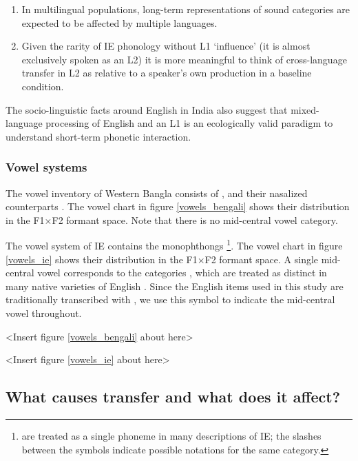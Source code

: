 \documentclass[12 pt]{article}
\newcommand{\nt}[1]{\textipa{[#1]}} %
\begin{document}
\begin{enumerate}[label=(\roman*)]
	\item In multilingual populations, long-term representations of sound categories are expected to be affected by multiple languages. 
	\item Given the rarity of IE phonology without L1 `influence' (it is almost exclusively spoken as an L2) it is more meaningful to think of cross-language transfer in L2 as relative to a speaker's own production in a baseline condition.
\end{enumerate}

The socio-linguistic facts around English in India also suggest that mixed-language processing of English and an L1 is an ecologically valid paradigm to understand short-term phonetic interaction.

\subsubsection*{Vowel systems} \label{vowel systems}
The vowel inventory of Western Bangla consists of \nt{i, e, \ae, a:, O, o, u}, and their nasalized counterparts \citep{garry2001facts}. The vowel chart in figure \ref{vowels_bengali} shows their distribution in the F1$\times$F2 formant space. Note that there is no mid-central vowel category. 


The vowel system of IE contains the monophthongs \nt{I, i, E, e, \ae, @/2/3, a, O, o, U, u} \citep{wells1982accents, masica1972sound}\footnote{\nt{@, 2, and 3} are treated as a single phoneme in many descriptions of IE; the slashes between the symbols indicate possible notations for the same category.}. The vowel chart in figure \ref{vowels_ie} shows their distribution in the F1$\times$F2 formant space. 
A single mid-central vowel corresponds to the categories \nt{2,@,3:}, which are treated as distinct in many native varieties of English \citep{nihalani1979indian,wells1982accents,hickey2005legacies,bansal1969intelligibility}. Since the English items used in this study are traditionally transcribed with \nt{2}, we use this symbol to indicate the mid-central vowel throughout. 
 
<Insert figure \ref{vowels_bengali} about here>

<Insert figure \ref{vowels_ie} about here>

\subsection{What causes transfer and what does it affect?}\label{causes}
\end{document}
